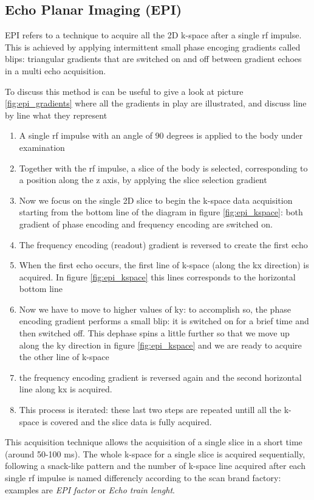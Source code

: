 \documentclass[11pt]{report}
\begin{document}
\subsection{Echo Planar Imaging (EPI)}\label{sec:epi}
EPI refers to a technique to acquire all the 2D k-space after a single rf impulse. This is achieved by applying intermittent small phase encoging gradients called blips: triangular gradients that are switched on and off between gradient echoes in a multi echo acquisition.

To discuss this method is can be useful to give a look at picture \ref{fig:epi_gradients} where all the gradients in play are illustrated, and discuss line by line what they represent
\begin{enumerate}
\item A single rf impulse with an angle of 90 degrees is applied to the body under examination
\item Together with the rf impulse, a slice of the body is selected, corresponding to a position along the z axis, by applying the slice selection gradient
\item Now we focus on the single 2D slice to begin the k-space data acquisition starting from the bottom line of the diagram in figure \ref{fig:epi_kspace}: both gradient of phase encoding and frequency encoding are switched on.
\item The frequency encoding (readout) gradient is reversed to create the first echo
\item When the first echo occurs, the first line of k-space (along the kx direction) is acquired. In figure \ref{fig:epi_kspace} this lines corresponds to the horizontal bottom line
\item Now we have to move to higher values of ky: to accomplish so, the phase encoding gradient performs a small blip: it is switched on for a brief time and then switched off. This dephase spins a little further so that we move up along the ky direction in figure \ref{fig:epi_kspace} and we are ready to acquire the other line of k-space
\item the frequency encoding gradient is reversed again and the second horizontal line along kx is acquired.
\item This process is iterated: these last two steps are repeated untill all the k-space is covered and the slice data is fully acquired.
\end{enumerate}

This acquisition technique allows the acquisition of a single slice in a short time (around 50-100 ms). The whole k-space for a single slice is acquired sequentially, following a snack-like pattern and the number of k-space line acquired after each single rf impulse is named differencly according to the scan brand factory: examples are \emph{EPI factor} or \emph{Echo train lenght}.
\end{document}
